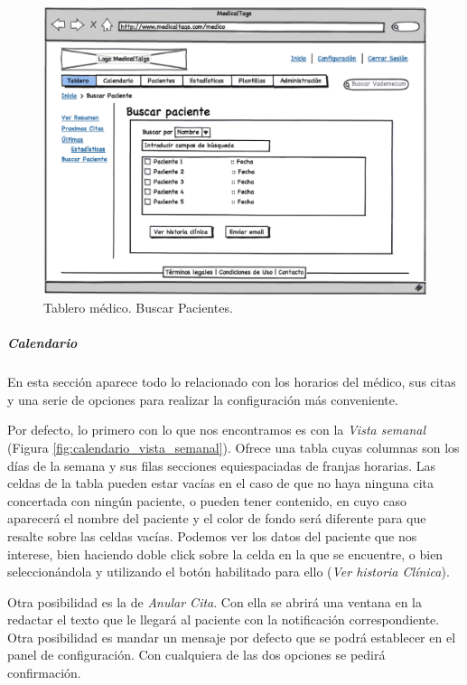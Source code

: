 \documentclass[a4paper,oneside,11pt]{book}
\begin{document}
			\begin{figure}[H]
			  \centering
			    \includegraphics[width=12cm]{img/eps/11_Dashboard_Medico_Tablero_Paciente.eps}
			  \caption{Tablero médico. Buscar Pacientes.}
			  \label{fig:tablero_medico_pacientes}
			\end{figure}
		
		
		
		\subparagraph{Calendario} %
		\label{par:medico_calendario}
		
			En esta sección aparece todo lo relacionado con los horarios del médico, sus citas y una serie de opciones para realizar la configuración  más conveniente.
			
			Por defecto, lo primero con lo que nos encontramos es con la \textit{Vista semanal} (Figura \ref{fig:calendario_vista_semanal}). Ofrece una tabla cuyas columnas son los días de la semana y sus filas secciones equiespaciadas de franjas horarias. Las celdas de la tabla pueden estar vacías en el caso de que no haya ninguna cita concertada con ningún paciente, o pueden tener contenido, en cuyo caso aparecerá el nombre del paciente y el color de fondo será diferente para que resalte sobre las celdas vacías. Podemos ver los datos del paciente que nos interese, bien haciendo doble click sobre la celda en la que se encuentre, o bien seleccionándola y utilizando el botón habilitado para ello (\textit{Ver historia Clínica}). 
			
			Otra posibilidad es la de \textit{Anular Cita}. Con ella se abrirá una ventana en la redactar el texto que le llegará al paciente con la notificación correspondiente. Otra posibilidad es mandar un mensaje por defecto que se podrá establecer en el panel de configuración. Con cualquiera de las dos opciones se pedirá confirmación.			
			
\end{document}
